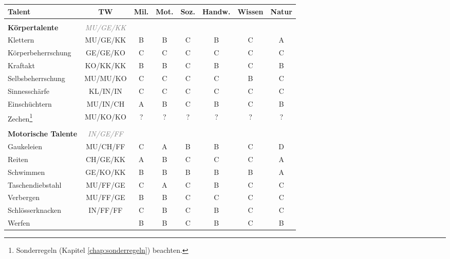 \begin{center}
\begin{longtable}{|l|c|c|c|c|c|c|c|}
\hline
Talent & TW & Mil. & Mot. & Soz. & Handw. & Wissen & Natur \\

\hline
\multicolumn{8}{|l|}{} \\
\multicolumn{1}{|l}{\textbf{Körpertalente}} & \multicolumn{1}{c}{\textcolor{gray}{\textit{MU/GE/KK}}} & \multicolumn{6}{r|}{} \\
\hline
Klettern & MU/GE/KK & B & B & C & B & C & A \\
\hline
Körperbeherrschung & GE/GE/KO & C & C & C & C & C & C \\
\hline
Kraftakt & KO/KK/KK & B & B & C & B & C & B \\
\hline
Selbsbeherrschung & MU/MU/KO & C & C & C & C & B & C \\
\hline
Sinnesschärfe & KL/IN/IN & C & C & C & C & C & C \\
\hline
Einschüchtern & MU/IN/CH & A & B & C & B & C & B \\
\hline
Zechen\footnote{Sonderregeln (Kapitel \ref{chap:sonderregeln}) beachten.} & MU/KO/KO & ? & ? & ? & ? & ? & ? \\


\hline
\multicolumn{8}{|l|}{} \\
\multicolumn{1}{|l}{\textbf{Motorische Talente}} & \multicolumn{1}{c}{\textcolor{gray}{\textit{IN/GE/FF}}} & \multicolumn{6}{r|}{} \\
\hline
Gaukeleien & MU/CH/FF & C & A & B & B & C & D \\
\hline
Reiten & CH/GE/KK & A & B & C & C & C & A \\
\hline
Schwimmen & GE/KO/KK & B & B & B & B & B & A \\
\hline
Taschendiebstahl & MU/FF/GE & C & A & C & B & C & C \\
\hline
Verbergen & MU/FF/GE & B & B & C & C & C & C \\
\hline
Schlösserknacken & IN/FF/FF & C & B & C & B & C & C \\
\hline
Werfen\footnotemark[3] & & B & B & C & B & C & B \\
 


\end{longtable}
\end{center}
